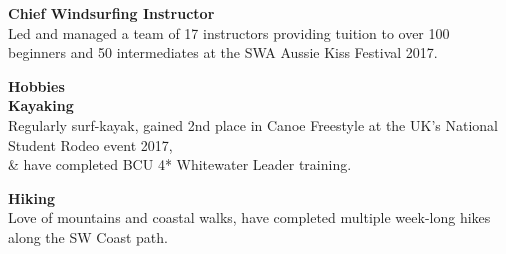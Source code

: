 \documentclass[10pt]{article}
\newcommand{\bold}[1]{\textbf{\textcolor{dark}{#1}}}
\newcommand{\sect}[1]{{\LARGE\bold{#1}}\vspace{0.2em}\\}
\newcommand{\xx}[2]{{\large\bold{#1}}\\{#2}\vspace{0.5em}}
\begin{document}
\begin{minipage}[t]{0.33\textwidth}
\xx{Chief Windsurfing Instructor}
{Led and managed a team of 17 instructors providing tuition to over 100 beginners and 50 intermediates at the SWA Aussie Kiss Festival 2017.}


\vspace{0.4em}
\sect{Hobbies}

\xx{Kayaking}
{Regularly surf-kayak, gained 2nd place in Canoe Freestyle at the UK's National Student Rodeo event 2017,\\ \& have completed BCU 4* Whitewater Leader training.
}

\xx{Hiking}
{Love of mountains and coastal walks, have completed multiple week-long hikes along the SW Coast path.}




\end{minipage} 
\hfill
\end{document}
